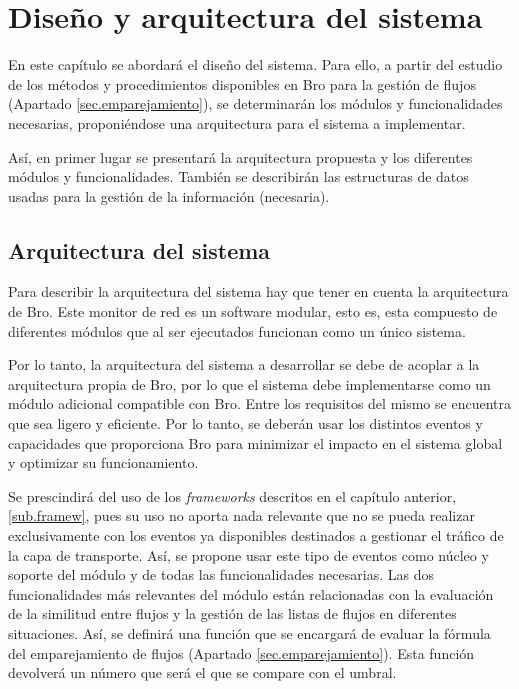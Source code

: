 \chapter{Diseño y arquitectura del sistema}\label{diseno}

En este capítulo se abordará el diseño del sistema. Para ello, a partir del estudio de los métodos y procedimientos disponibles en 
Bro para la gestión de flujos (Apartado \ref{sec.emparejamiento}), se determinarán los módulos y funcionalidades necesarias, 
proponiéndose una arquitectura para el sistema a implementar.

\intro Así, en primer lugar se presentará la arquitectura propuesta y los diferentes módulos y funcionalidades. También se describirán 
las estructuras de datos usadas para la gestión de la información (necesaria).

\section{Arquitectura del sistema}

Para describir la arquitectura del sistema hay que tener en cuenta la arquitectura de Bro. Este monitor de red es un software modular, 
esto es, esta compuesto de diferentes módulos que al ser ejecutados funcionan como un único sistema.

\intro Por lo tanto, la arquitectura del sistema a desarrollar se debe de acoplar a la arquitectura propia de Bro, por lo que el 
sistema debe implementarse como un módulo adicional compatible con Bro. Entre los requisitos del mismo se encuentra que sea ligero y 
eficiente. Por lo tanto, se deberán usar los distintos eventos y capacidades que proporciona Bro para minimizar el impacto en el 
sistema global y optimizar su funcionamiento.

\intro Se prescindirá del uso de los \textit{frameworks} descritos en el capítulo anterior, \ref{sub.framew}, pues su uso no aporta 
nada relevante que no se pueda realizar exclusivamente con los eventos ya disponibles destinados a gestionar el tráfico de la capa de 
transporte. Así, se propone usar este tipo de eventos como núcleo y soporte del módulo y de todas las funcionalidades necesarias. Las 
dos funcionalidades más relevantes del módulo están relacionadas con la evaluación de la similitud entre flujos y la gestión de las 
listas de flujos en diferentes situaciones. Así, se definirá una función que se encargará de evaluar la fórmula del emparejamiento de 
flujos (Apartado \ref{sec.emparejamiento}). Esta función devolverá un número que será el que se compare con el umbral.

